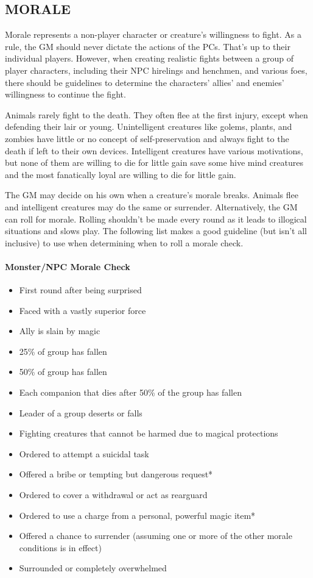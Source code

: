 \begin{multicols}{2}
\section{MORALE}

Morale represents a non-player character or creature's willingness to fight.  As a rule, the GM should never dictate the actions of the PCs.  That's up to their individual players.  However, when creating realistic fights between a group of player characters, including their NPC hirelings and henchmen, and various foes, there should be guidelines to determine the characters' allies' and enemies' willingness to continue the fight.

Animals rarely fight to the death. They often flee at the first injury, except when defending their lair or young.  Unintelligent creatures like golems, plants, and zombies have little or no concept of self-preservation and always fight to the death if left to their own devices.  Intelligent creatures have various motivations, but none of them are willing to die for little gain save some hive mind creatures and the most fanatically loyal are willing to die for little gain.  

The GM may decide on his own when a creature's morale breaks.  Animals flee and intelligent creatures may do the same or surrender.  Alternatively, the GM can roll for morale.  Rolling shouldn't be made every round as it leads to illogical situations and slows play.  The following list makes a good guideline (but isn't all inclusive) to use when determining when to roll a morale check.

\paragraph{Monster/NPC Morale Check}

\begin{itemize}

\item First round after being surprised
\item Faced with a vastly superior force
\item Ally is slain by magic
\item 25\% of group has fallen
\item 50\% of group has fallen
\item Each companion that dies after 50\% of the group has fallen
\item Leader of a group deserts or falls
\item Fighting creatures that cannot be harmed due to magical protections
\item Ordered to attempt a suicidal task
\item Offered a bribe or tempting but dangerous request*
\item Ordered to cover a withdrawal or act as rearguard
\item Ordered to use a charge from a personal, powerful magic item*
\item Offered a chance to surrender (assuming one or more of the other morale conditions is in effect)
\item Surrounded or completely overwhelmed


\end{itemize}
\end{multicols}
